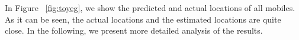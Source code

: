 \documentclass[conference, 10pt]{IEEEtran}
\begin{document}
In Figure ~\ref{fig:toyeg}, we show the predicted and actual locations of all mobiles. As it can be seen, the actual locations
and the estimated locations are quite close. In the following, we present more
detailed analysis of the results.

\begin{figure}[t]
	\begin{center}
\end{center}
\end{figure}
\end{document}
